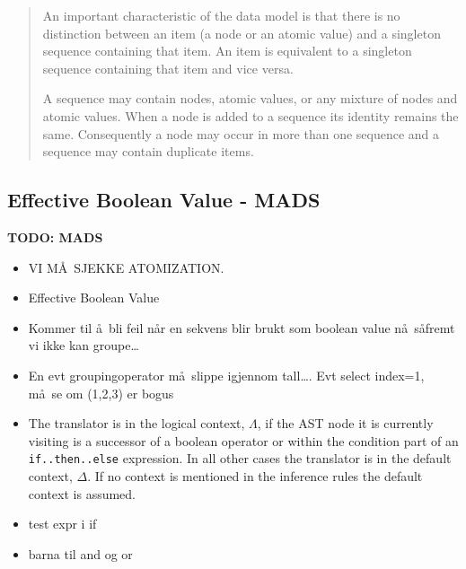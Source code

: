 \begin{quotation}
An important characteristic of the data model is that there is no distinction between an item (a node or an atomic
value) and a singleton sequence containing that item. An item is equivalent to a singleton sequence containing
that item and vice versa.

A sequence may contain nodes, atomic values, or any mixture of nodes and atomic values. When a node is added to a
sequence its identity remains the same. Consequently a node may occur in more than one sequence and a sequence may
contain duplicate items.
\end{quotation}

\subsection{Effective Boolean Value - {MADS}}
\label{sect:disc:effBool}
\textbf{\LARGE TODO: {MADS}}
\begin{itemize}
\item VI M\AA~SJEKKE ATOMIZATION.
\item Effective Boolean Value
\item Kommer til \aa~bli feil n\aa r en sekvens blir brukt som boolean value n\aa~s\aa fremt vi ikke kan groupe\ldots
\item En evt groupingoperator m\aa~slippe igjennom tall\ldots. Evt select index=1, m\aa~se om (1,2,3) er bogus
\item The translator is in the logical context, $\Lambda$, if the AST node it is currently visiting is a successor
of a boolean operator or within the condition part of an \texttt{if..then..else} expression. In all other cases the
translator is in the default context, $\Delta$. If no context is mentioned in the inference rules the default
context is assumed. 
\item test expr i if
\item barna til and og or
\end{itemize}